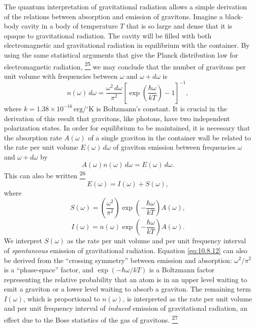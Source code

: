 The quantum interpretation of gravitational radiation allows a simple
derivation of the relations between absorption and emission of gravitons.
Imagine a black-body cavity in a body of temperature \(T\) that is so large
and dense that it is opaque to gravitational radiation. The cavity will be
filled with both electromagnetic and gravitational radiation in equilibrium
with the container. By using the same statistical arguments that give the
Planck distribution law for electromagnetic radiation,%
\hyperref[ch10-ref-25]{\textsuperscript{25}}
we may conclude that the number of gravitons per unit volume with frequencies
between \(\omega\) and \(\omega+d\omega\) is
\begin{equation}
  n(\omega)\,d\omega
  =
  \frac{\omega^2\,d\omega}{\pi^2}
  \left[
    \exp\!\left(\frac{\hbar\omega}{kT}\right)-1
  \right]^{-1},
  \tag{10.8.9}\label{eq:10.8.9}
\end{equation}
where \(k=1.38\times10^{-16}\,\mathrm{erg/{}^\circ K}\) is Boltzmann's
constant. It is crucial in the derivation of this result that gravitons, like
photons, have two independent polarization states. In order for equilibrium to
be maintained, it is necessary that the absorption rate \(A(\omega)\) of a
single graviton in the container wall be related to the rate per unit volume
\(E(\omega)\,d\omega\) of graviton emission between frequencies \(\omega\)
and \(\omega+d\omega\) by
\begin{equation}
  A(\omega)n(\omega)\,d\omega=E(\omega)\,d\omega.
  \tag{10.8.10}\label{eq:10.8.10}
\end{equation}
This can also be written%
\hyperref[ch10-ref-26]{\textsuperscript{26}}
\begin{equation}
  E(\omega)=I(\omega)+S(\omega),
  \tag{10.8.11}\label{eq:10.8.11}
\end{equation}
where
\begin{equation}
  S(\omega)
  =
  \left(\frac{\omega^2}{\pi^2}\right)
  \exp\!\left(-\frac{\hbar\omega}{kT}\right)A(\omega),
  \tag{10.8.12}\label{eq:10.8.12}
\end{equation}
\begin{equation}
  I(\omega)
  =
  n(\omega)
  \exp\!\left(-\frac{\hbar\omega}{kT}\right)A(\omega).
  \tag{10.8.13}\label{eq:10.8.13}
\end{equation}
We interpret \(S(\omega)\) as the rate per unit volume and per unit frequency
interval of \emph{spontaneous} emission of gravitational radiation. Equation
\eqref{eq:10.8.12} can also be derived from the ``crossing symmetry''
between emission and absorption: \(\omega^2/\pi^2\) is a ``phase-space''
factor, and \(\exp(-\hbar\omega/kT)\) is a Boltzmann factor representing the
relative probability that an atom is in an upper level waiting to emit a
graviton or a lower level waiting to absorb a graviton. The remaining term
\(I(\omega)\), which is proportional to \(n(\omega)\), is interpreted as the
rate per unit volume and per unit frequency interval of \emph{induced}
emission of gravitational radiation, an effect due to the Bose statistics of
the gas of gravitons.%
\hyperref[ch10-ref-27]{\textsuperscript{27}}

